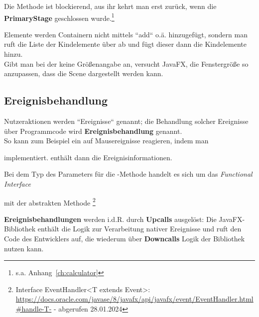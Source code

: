 \begin{tcolorbox}[enlarge top by=0.5cm,enlarge bottom by=0.5cm]
    Die Methode  ist blockierend, aus ihr kehrt man erst zurück, wenn die \textbf{PrimaryStage} geschlossen wurde.\footnote{
    s.a. Anhang~\ref{ch:calculator}
    }
\end{tcolorbox}

\noindent
Elemente werden Containern nicht mittels ``add`` o.ä. hinzugefügt, sondern man ruft die Liste der Kindelemente über  ab und fügt dieser dann die Kindelemente hinzu.\\

\noindent
Gibt man bei der  keine Größenangabe an, versucht JavaFX, die Fenstergröße so anzupassen, dass die Scene dargestellt werden kann.

\subsection{Ereignisbehandlung}

Nutzeraktionen werden ``Ereignisse`` genannt; die Behandlung solcher Ereignisse über Programmcode wird \textbf{Ereignisbehandlung} genannt.\\

\noindent
So kann zum Beispiel ein  auf Mausereignisse reagieren, indem man

\begin{center}\end{center}

implementiert.  enthält dann die Ereignisinformationen.

\begin{tcolorbox}[enlarge top by=0.5cm,enlarge bottom by=0.5cm]
    Bei dem Typ des Parameters für die -Methode handelt es sich um das \textit{Functional Interface}
     \begin{center}
     \end{center}
    mit der abstrakten Methode \footnote{
        Interface EventHandler<T extends Event>: \url{https://docs.oracle.com/javase/8/javafx/api/javafx/event/EventHandler.html#handle-T-} - abgerufen 28.01.2024
    }
\end{tcolorbox}

\noindent
\textbf{Ereignisbehandlungen} werden i.d.R. durch \textbf{Upcalls} ausgelöst: Die JavaFX-Bibliothek enthält die Logik zur Verarbeitung nativer Ereignisse und ruft den Code des Entwicklers auf, die wiederum über \textbf{Downcalls} Logik der Bibliothek nutzen kann.

